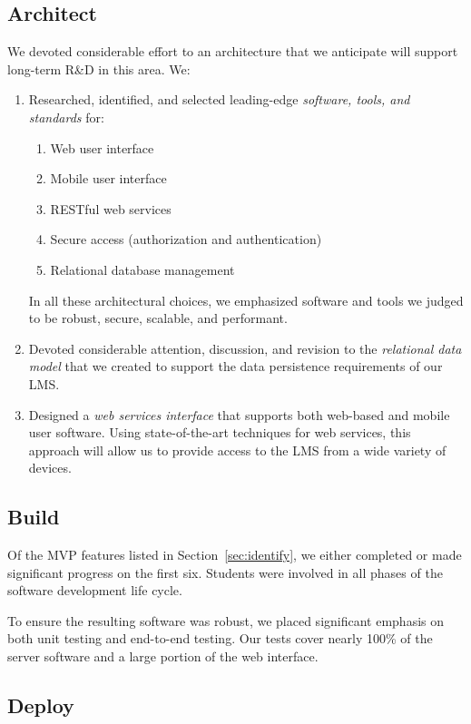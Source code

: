 \documentclass{article}
\begin{document}
\subsection{Architect}

We devoted considerable effort
to an architecture that we anticipate
will support long-term R\&D in this area.
We:
\begin{enumerate}
\item Researched, identified, and selected
  leading-edge \emph{software, tools, and standards} for:
  \begin{enumerate}
  \item Web user interface
  \item Mobile user interface
  \item RESTful web services
  \item Secure access (authorization and authentication)
  \item Relational database management
  \end{enumerate}
  In all these architectural choices,
  we emphasized software and tools we judged to be
  robust, secure, scalable, and performant.
\item Devoted considerable attention, discussion, and revision
  to the \emph{relational data model} that we created
  to support the data persistence requirements
  of our LMS.
\item Designed a \emph{web services interface}
  that supports both web-based and mobile
  user software.
  Using state-of-the-art techniques for web services,
  this approach will allow us to provide access
  to the LMS from a wide variety of devices.
\end{enumerate}

\subsection{Build}

Of the MVP features listed in Section~\ref{sec:identify},
we either completed or made significant progress
on the first six.
Students were involved in all phases
of the software development life cycle.

To ensure the resulting software was robust,
we placed significant emphasis on
both unit testing and end-to-end testing.
Our tests cover nearly 100\% of the server software
and a large portion of the web interface.

\subsection{Deploy}
\end{document}
